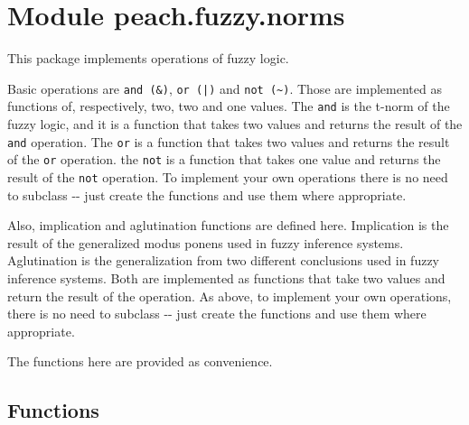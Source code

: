 %
%
%


\section{Module peach.fuzzy.norms}

    \label{peach:fuzzy:norms}

This package implements operations of fuzzy logic.

Basic operations are \texttt{and (\&)}, \texttt{or (|)} and \texttt{not (\textasciitilde{})}. Those are
implemented as functions of, respectively, two, two and one values. The \texttt{and}
is the t-norm of the fuzzy logic, and it is a function that takes two values and
returns the result of the \texttt{and} operation. The \texttt{or} is a function that takes
two values and returns the result of the \texttt{or} operation. the \texttt{not} is a
function that takes one value and returns the result of the \texttt{not} operation.
To implement your own operations there is no need to subclass -{}- just create the
functions and use them where appropriate.

Also, implication and aglutination functions are defined here. Implication is
the result of the generalized modus ponens used in fuzzy inference systems.
Aglutination is the generalization from two different conclusions used in fuzzy
inference systems. Both are implemented as functions that take two values and
return the result of the operation. As above, to implement your own operations,
there is no need to subclass -{}- just create the functions and use them where
appropriate.

The functions here are provided as convenience.


  \subsection{Functions}

